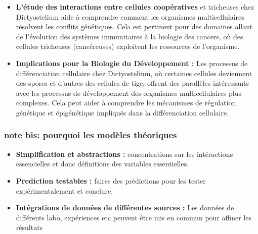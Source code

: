 \documentclass[twocolumn,10pt]{article} %
\begin{document}
\begin{itemize}
                        \item \textbf{L'étude des interactions entre cellules coopératives} et tricheuses chez Dictyostelium aide à comprendre comment 
                        les organismes multicellulaires résolvent les conflits génétiques. Cela est pertinent pour des domaines allant de 
                        l'évolution des systèmes immunitaires à la biologie des cancers, où des cellules tricheuses (cancéreuses) 
                        exploitent les ressources de l'organisme.


                        \item \textbf{Implications pour la Biologie du Développement :} Les processus de différenciation cellulaire chez Dictyostelium, où 
                        certaines cellules deviennent des spores et d'autres des cellules de tige, offrent des parallèles intéressants avec 
                        les processus de développement des organismes multicellulaires plus complexes.
                        Cela peut aider à comprendre les mécanismes de régulation génétique et épigénétique impliqués dans la différenciation cellulaire.
                    \end{itemize}

                    \subsubsection{note bis: pourquoi les modèles théoriques}
                    \begin{itemize}
                        \item \textbf{Simplification et abstractions :} concentrations sur les intéractions essencielles et donc définitions des variables essentielles.
                        \item \textbf{Prediction testables :} faires des prédictions pour les tester expérimentalement et conclure.
                        \item \textbf{Intégrations de données de différentes sources : } Les données de différents labo, expériences etc peuvent être mis en commun pour 
                        affiner les résultats
                        
                    \end{itemize}


\end{document}
